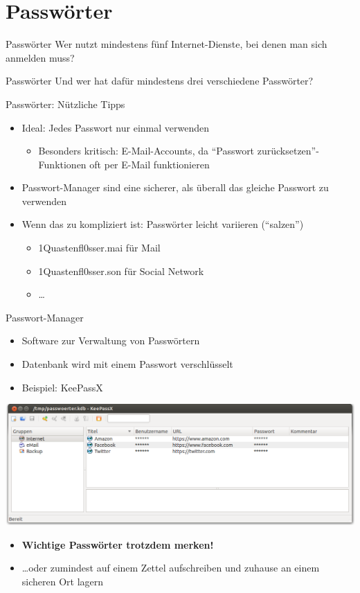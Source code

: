 \section{Passwörter}
  \begin{frame}{Passwörter}
    \Large Wer nutzt mindestens fünf Internet-Dienste, bei denen man sich anmelden muss?
  \end{frame}
  \begin{frame}{Passwörter}
    \Large Und wer hat dafür mindestens drei verschiedene Passwörter?
  \end{frame}
  \begin{frame}{Passwörter: Nützliche Tipps}
    \begin{itemize}
      \item Ideal: Jedes Passwort nur einmal verwenden
      \begin{itemize}
        \item Besonders kritisch: E-Mail-Accounts, da ``Passwort zurücksetzen''-Funktionen oft per E-Mail funktionieren
      \end{itemize}
      \item Passwort-Manager sind eine sicherer, als überall das gleiche Passwort zu verwenden
      \item Wenn das zu kompliziert ist: Passwörter leicht variieren (``salzen'')
      \begin{itemize}
        \item 1Quastenfl0sser.mai für Mail
        \item 1Quastenfl0sser.son für Social Network
        \item \ldots
      \end{itemize}
    \end{itemize}
  \end{frame}
  \begin{frame}{Passwort-Manager}
    \begin{itemize}
      \item Software zur Verwaltung von Passwörtern
      \item Datenbank wird mit einem Passwort verschlüsselt
      \item Beispiel: KeePassX
    \end{itemize}
      \includegraphics[width=\textwidth]{images/keepassx.png}
    \begin{itemize}
      \item \textbf{Wichtige Passwörter trotzdem merken!}
      \item \ldots oder zumindest auf einem Zettel aufschreiben und zuhause an einem sicheren Ort lagern
    \end{itemize}
  \end{frame}
